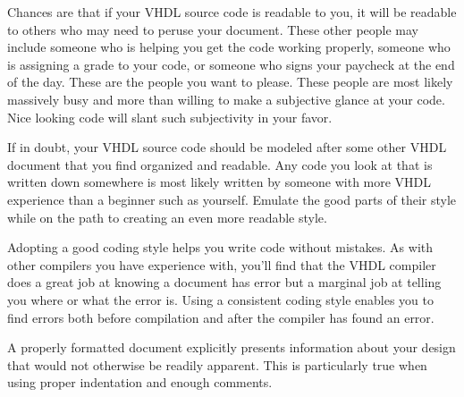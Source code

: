 \begin{my_list}
\item Chances are that if your VHDL source code is readable to you, it will be readable to others who may need to peruse your document. These other people may include someone who is helping you get the code working properly, someone who is assigning a grade to your code, or someone who signs your paycheck at the end of the day. These are the people you want to please. These people are most likely massively busy and more than willing to make a subjective glance at your code. Nice looking code will slant such subjectivity in your favor.
\item If in doubt, your VHDL source code should be modeled after some other VHDL document that you find organized and readable. Any code you look at that is written down somewhere is most likely written by someone with more VHDL experience than a beginner such as yourself. Emulate the good parts of their style while on the path to creating an even more readable style.
\item Adopting a good coding style helps you write code without mistakes. As with other compilers you have experience with, you'll find that the VHDL compiler does a great job at knowing a document has error but a marginal job at telling you where or what the error is. Using a consistent coding style enables you to find errors both before compilation and after the compiler has found an error.
\item A properly formatted document explicitly presents information about your design that would not otherwise be readily apparent. This is particularly true when using proper indentation and enough comments.
\end{my_list}
\null\newpage
\thispagestyle{empty}



